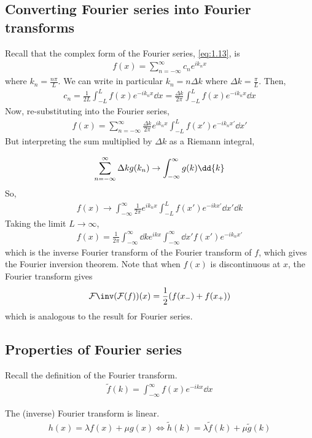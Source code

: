 \subsection{Converting Fourier series into Fourier transforms}
Recall that the complex form of the Fourier series, \cref{eq:1.13}, is
\begin{align*}
	f(x) = \sum_{n=-\infty}^\infty c_n e^{ik_n x}
\end{align*}
where $k_n = \frac{n\pi}{L}$.
We can write in particular $k_n = n \Delta k$ where $\Delta k = \frac{\pi}{L}$.
Then,
\begin{align*}
	c_n = \frac{1}{2L} \int_{-L}^L f(x) e^{-ik_n x} \dd{x} = \frac{\Delta k}{2\pi} \int_{-L}^L f(x) e^{-ik_n x}\dd{x}
\end{align*}
Now, re-substituting into the Fourier series,
\begin{align*}
	f(x) = \sum_{n=-\infty}^\infty \frac{\Delta k}{2\pi} e^{i k_n x} \int_{-L}^L f(x') e^{-ik_n x'} \dd{x'}
\end{align*}
But interpreting the sum multiplied by $\Delta k$ as a Riemann integral,
\addtocounter{equation}{-1}
\begin{subequations}
	\addtocounter{equation}{1}
	\begin{align} \label{eq:8.6b}
		\sum_{n=-\infty}^{\infty} \Delta k g(k_n) \to \int_{-\infty}^{\infty} g(k) \dd{k}
	\end{align}
\end{subequations}
So,
\begin{align*}
	f(x) \to \int_{-\infty}^\infty \frac{1}{2\pi} e^{i k_n x} \int_{-L}^L f(x') e^{-ik x'} \dd{x'} \dd{k}
\end{align*}
Taking the limit $L \to \infty$,
\begin{align*}
	f(x) = \frac{1}{2\pi} \int_{-\infty}^\infty \dd{k} e^{i k x} \int_{-\infty}^\infty \dd{x'} f(x') e^{-ik_n x'}
\end{align*}
which is the inverse Fourier transform of the Fourier transform of $f$, which gives the Fourier inversion theorem.
Note that when $f(x)$ is discontinuous at $x$, the Fourier transform gives
\begin{align} \label{eq:8.7}
	\mathcal F\inv(\mathcal F(f))(x) = \frac{1}{2}(f(x_-) + f(x_+))
\end{align}
which is analogous to the result for Fourier series.

\subsection{Properties of Fourier series}
Recall the definition of the Fourier transform.
\begin{align*}
	\widetilde f(k) = \int_{-\infty}^\infty f(x) e^{-ikx} \dd{x}
\end{align*}
\begin{proposition}[Linearity]
	The (inverse) Fourier transform is linear.
	\begin{align} \label{eq:8.8}
		h(x) = \lambda f(x) + \mu g(x) \iff \widetilde h(k) = \lambda \widetilde f(k) + \mu \widetilde g(k)
	\end{align}
\end{proposition}

